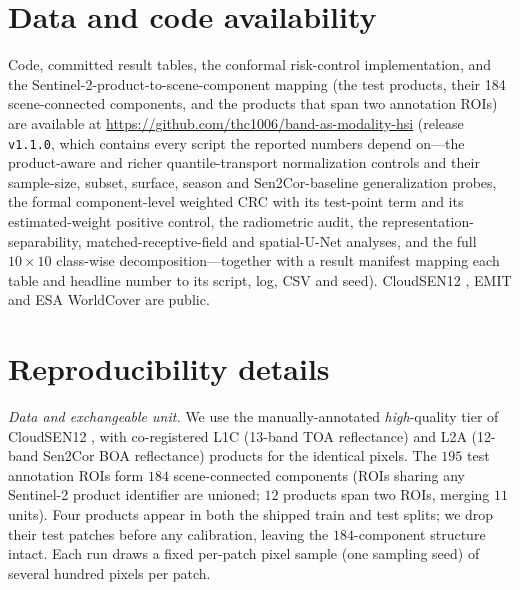 \documentclass[preprint,3p,times]{elsarticle}
\begin{document}
\section*{Data and code availability}
Code, committed result tables, the conformal risk-control implementation, and the Sentinel-2-product-to-scene-component mapping (the test products, their 184 scene-connected components, and the products that span two annotation ROIs) are available at \url{https://github.com/thc1006/band-as-modality-hsi} (release \texttt{v1.1.0}, which contains every script the reported numbers depend on---the product-aware and richer quantile-transport normalization controls and their sample-size, subset, surface, season and Sen2Cor-baseline generalization probes, the formal component-level weighted CRC with its test-point term and its estimated-weight positive control, the radiometric audit, the representation-separability, matched-receptive-field and spatial-U-Net analyses, and the full $10\times10$ class-wise decomposition---together with a result manifest mapping each table and headline number to its script, log, CSV and seed). CloudSEN12 \citep{aybar2022cloudsen12}, EMIT and ESA WorldCover are public.

\appendix
\section{Reproducibility details}
\label{app:repro}
\emph{Data and exchangeable unit.} We use the manually-annotated \emph{high}-quality tier of CloudSEN12 \citep{aybar2022cloudsen12}, with co-registered L1C (13-band TOA reflectance) and L2A (12-band Sen2Cor BOA reflectance) products for the identical pixels. The $195$ test annotation ROIs form $184$ scene-connected components (ROIs sharing any Sentinel-2 product identifier are unioned; $12$ products span two ROIs, merging $11$ units). Four products appear in both the shipped train and test splits; we drop their test patches before any calibration, leaving the $184$-component structure intact. Each run draws a fixed per-patch pixel sample (one sampling seed) of several hundred pixels per patch.
\end{document}
